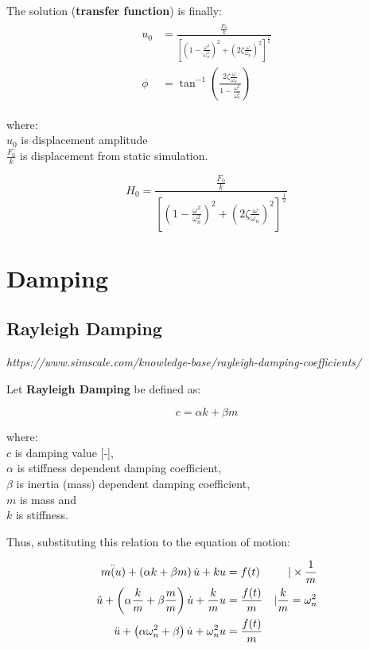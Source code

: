 \documentclass[10pt,b5paper,titlepage]{book}
\newenvironment{eqarray}
{
    \begin{eqnarray}
        \begin{aligned}
}
{
        \end{aligned}
    \end{eqnarray}
}
\begin{document}
The solution (\textbf{transfer function}) is finally:
\begin{eqarray}
    u_0 &= \frac{\frac{F_0}{k}}{
        \left[
            \left( 1 - \frac{\omega^2}{\omega_n^2} \right)^2 +
            \left( 2 \zeta \frac{\omega}{\omega_n} \right)^2
    \right]^{\frac{1}{2}}}\\
    \phi &= \tan^{-1} \left(
        \frac{2 \zeta \frac{\omega}{\omega_n}}{
    1 - \frac{\omega^2}{\omega_n^2}} \right)
\end{eqarray}

where:\\
$ u_0 $ is displacement amplitude\\
$ \frac{F_0}{k} $ is displacement from static simulation.

\begin{equation}
    H_0 = \frac{\frac{F_0}{k}}{
        \left[
            \left( 1 - \frac{\omega^2}{\omega_n^2} \right)^2 +
            \left( 2 \zeta \frac{\omega}{\omega_n} \right)^2
    \right]^{\frac{1}{2}}}
\end{equation}





\newpage
\section{Damping}

\subsection{Rayleigh Damping}
\textit{https://www.simscale.com/knowledge-base/rayleigh-damping-coefficients/}

Let \textbf{Rayleigh Damping} be defined as:

\begin{equation}
    c = \alpha k + \beta m
\end{equation}

where:\\
$ c $ is damping value [-],\\
$ \alpha $ is stiffness dependent damping coefficient,\\
$ \beta $ is inertia (mass) dependent damping coefficient,\\
$ m $ is mass and\\
$ k $ is stiffness.

Thus, substituting this relation to the equation of motion:

\begin{eqarray}
    m \ddot(u) + \left(\alpha k + \beta m \right) \dot{u} + k u &= f(t) & \space \vert \times \frac{1}{m}\\
    \ddot{u} + \left(\alpha \frac{k}{m} + \beta \frac{m}{m} \right) \dot{u} + \frac{k}{m} u
    &= \frac{f(t)}{m} & \space \vert \frac{k}{m} = \omega_n^2 \\
    \ddot{u} + \left(\alpha \omega_n^2 + \beta \right) \dot{u} + \omega_n^2 u &= \frac{f(t)}{m} & \space
\end{eqarray}
\end{document}
